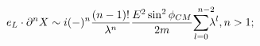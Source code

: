 \begin{equation}
e_{L}\cdot \partial ^{n}X\sim i(-)^{n}\frac{(n-1)!}{\lambda ^{n}}\frac{%
E^{2}\sin ^{2}\phi _{CM}}{2m}\overset{n-2}{\underset{l=0}{\sum }\lambda ^{l}}%
,n>1;
\end{equation}%
